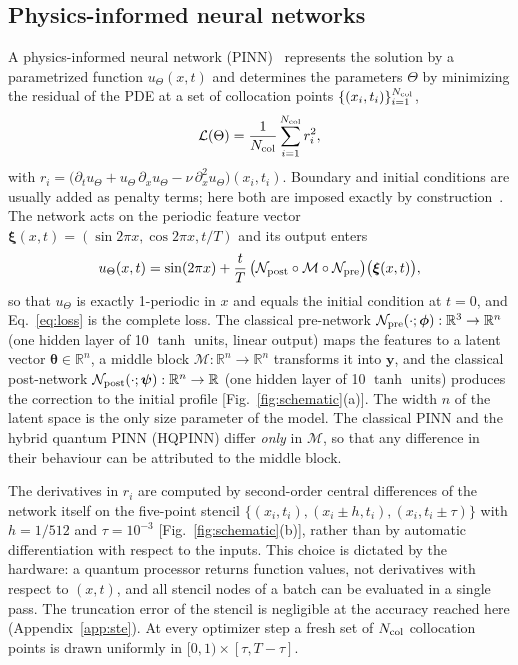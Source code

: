 \documentclass[floatfix,aps,pra,twocolumn,superscriptaddress,10pt,nofootinbib]{revtex4-2}
\newcommand{\Ncol}{N_{\rm col}}
\begin{document}
\subsection{Physics-informed neural networks}\label{sec:pinn}
A physics-informed neural network (PINN)~\cite{raissi2019physics,karniadakis2021physics} represents the solution by a parametrized function $u_\Theta(x,t)$ and determines the parameters $\Theta$ by minimizing the residual of the PDE at a set of collocation points $\{(x_i,t_i)\}_{i=1}^{\Ncol}$,
\begin{equation}
  \mathcal L(\Theta)=\frac{1}{\Ncol}\sum_{i=1}^{\Ncol} r_i^2,
  \label{eq:loss}
\end{equation}
with $r_i=\big(\partial_t u_\Theta+u_\Theta\,\partial_x u_\Theta-\nu\,\partial_x^2u_\Theta\big)(x_i,t_i)$.
Boundary and initial conditions are usually added as penalty terms; here both are imposed exactly by construction~\cite{lagaris1998artificial}. The network acts on the periodic feature vector $\bm\xi(x,t)=(\sin2\pi x,\cos2\pi x,t/T)$ and its output enters
\begin{equation}
  u_\Theta(x,t)=\sin(2\pi x)+\frac{t}{T}\,\big(\mathcal N_{\rm post}\circ\mathcal M\circ\mathcal N_{\rm pre}\big)\big(\bm\xi(x,t)\big),
  \label{eq:composition}
\end{equation}
so that $u_\Theta$ is exactly 1-periodic in $x$ and equals the initial condition at $t=0$, and Eq.~\eqref{eq:loss} is the complete loss. The classical pre-network $\mathcal N_{\rm pre}(\cdot;\bm\phi):\mathbb R^3\to\mathbb R^n$ (one hidden layer of 10 $\tanh$ units, linear output) maps the features to a latent vector $\bm\theta\in\mathbb R^n$, a middle block $\mathcal M:\mathbb R^n\to\mathbb R^n$ transforms it into $\bm y$, and the classical post-network $\mathcal N_{\rm post}(\cdot;\bm\psi):\mathbb R^n\to\mathbb R$ (one hidden layer of 10 $\tanh$ units) produces the correction to the initial profile [Fig.~\ref{fig:schematic}(a)]. The width $n$ of the latent space is the only size parameter of the model. The classical PINN and the hybrid quantum PINN (HQPINN) differ \emph{only} in $\mathcal M$, so that any difference in their behaviour can be attributed to the middle block.

The derivatives in $r_i$ are computed by second-order central differences of the network itself on the five-point stencil $\{(x_i,t_i),(x_i\pm h,t_i),(x_i,t_i\pm\tau)\}$ with $h=1/512$ and $\tau=10^{-3}$ [Fig.~\ref{fig:schematic}(b)], rather than by automatic differentiation with respect to the inputs. This choice is dictated by the hardware: a quantum processor returns function values, not derivatives with respect to $(x,t)$, and all stencil nodes of a batch can be evaluated in a single pass. The truncation error of the stencil is negligible at the accuracy reached here (Appendix~\ref{app:ste}). At every optimizer step a fresh set of $\Ncol$ collocation points is drawn uniformly in $[0,1)\times[\tau,T-\tau]$.
\end{document}
